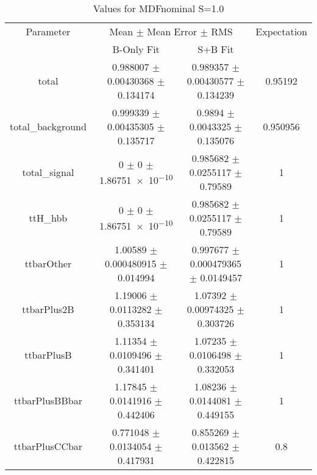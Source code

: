 \begin{table}
\centering
\caption{Values for MDFnominal S=1.0}
\begin{tabular}{cccc}
\toprule
Parameter & \multicolumn{2}{c}{Mean $\pm$ Mean Error $\pm$ RMS} & Expectation\\
 & B-Only Fit & S+B Fit & \\
\midrule
total & \num{0.988007} $\pm$ \num{0.00430368} $\pm$ \num{0.134174} & \num{0.989357} $\pm$ \num{0.00430577} $\pm$ \num{0.134239} & \num{0.95192}\\
total\_background & \num{0.999339} $\pm$ \num{0.00435305} $\pm$ \num{0.135717} & \num{0.9894} $\pm$ \num{0.0043325} $\pm$ \num{0.135076} & \num{0.950956}\\
total\_signal & \num{0} $\pm$ \num{0} $\pm$ \num{1.86751e-10} & \num{0.985682} $\pm$ \num{0.0255117} $\pm$ \num{0.79589} & \num{1}\\
ttH\_hbb & \num{0} $\pm$ \num{0} $\pm$ \num{1.86751e-10} & \num{0.985682} $\pm$ \num{0.0255117} $\pm$ \num{0.79589} & \num{1}\\
ttbarOther & \num{1.00589} $\pm$ \num{0.000480915} $\pm$ \num{0.014994} & \num{0.997677} $\pm$ \num{0.000479365} $\pm$ \num{0.0149457} & \num{1}\\
ttbarPlus2B & \num{1.19006} $\pm$ \num{0.0113282} $\pm$ \num{0.353134} & \num{1.07392} $\pm$ \num{0.00974325} $\pm$ \num{0.303726} & \num{1}\\
ttbarPlusB & \num{1.11354} $\pm$ \num{0.0109496} $\pm$ \num{0.341401} & \num{1.07235} $\pm$ \num{0.0106498} $\pm$ \num{0.332053} & \num{1}\\
ttbarPlusBBbar & \num{1.17845} $\pm$ \num{0.0141916} $\pm$ \num{0.442406} & \num{1.08236} $\pm$ \num{0.0144081} $\pm$ \num{0.449155} & \num{1}\\
ttbarPlusCCbar & \num{0.771048} $\pm$ \num{0.0134054} $\pm$ \num{0.417931} & \num{0.855269} $\pm$ \num{0.013562} $\pm$ \num{0.422815} & \num{0.8}\\
\bottomrule
\end{tabular}
\end{table}